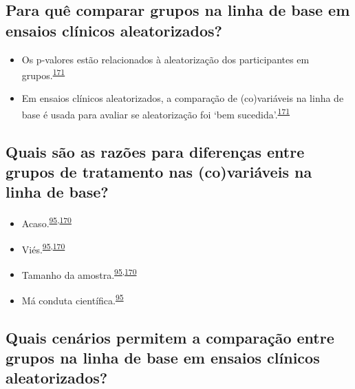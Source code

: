 \documentclass[
  a4paper,
]{book}
\begin{document}
\hypertarget{para-quuxea-comparar-grupos-na-linha-de-base-em-ensaios-cluxednicos-aleatorizados}{%
\subsection{Para quê comparar grupos na linha de base em ensaios clínicos aleatorizados?}\label{para-quuxea-comparar-grupos-na-linha-de-base-em-ensaios-cluxednicos-aleatorizados}}

\begin{itemize}
\item
  Os p-valores estão relacionados à aleatorização dos participantes em grupos.\textsuperscript{\protect\hyperlink{ref-Bolzern2019}{171}}
\item
  Em ensaios clínicos aleatorizados, a comparação de (co)variáveis na linha de base é usada para avaliar se aleatorização foi `bem sucedida'.\textsuperscript{\protect\hyperlink{ref-Bolzern2019}{171}}
\end{itemize}

\hypertarget{quais-suxe3o-as-razuxf5es-para-diferenuxe7as-entre-grupos-de-tratamento-nas-covariuxe1veis-na-linha-de-base}{%
\subsection{Quais são as razões para diferenças entre grupos de tratamento nas (co)variáveis na linha de base?}\label{quais-suxe3o-as-razuxf5es-para-diferenuxe7as-entre-grupos-de-tratamento-nas-covariuxe1veis-na-linha-de-base}}

\begin{itemize}
\item
  Acaso.\textsuperscript{\protect\hyperlink{ref-chen2020}{95},\protect\hyperlink{ref-Stang2018}{170}}
\item
  Viés.\textsuperscript{\protect\hyperlink{ref-chen2020}{95},\protect\hyperlink{ref-Stang2018}{170}}
\item
  Tamanho da amostra.\textsuperscript{\protect\hyperlink{ref-chen2020}{95},\protect\hyperlink{ref-Stang2018}{170}}
\item
  Má conduta científica.\textsuperscript{\protect\hyperlink{ref-chen2020}{95}}
\end{itemize}

\hypertarget{quais-cenuxe1rios-permitem-a-comparauxe7uxe3o-entre-grupos-na-linha-de-base-em-ensaios-cluxednicos-aleatorizados}{%
\subsection{Quais cenários permitem a comparação entre grupos na linha de base em ensaios clínicos aleatorizados?}\label{quais-cenuxe1rios-permitem-a-comparauxe7uxe3o-entre-grupos-na-linha-de-base-em-ensaios-cluxednicos-aleatorizados}}
\end{document}
